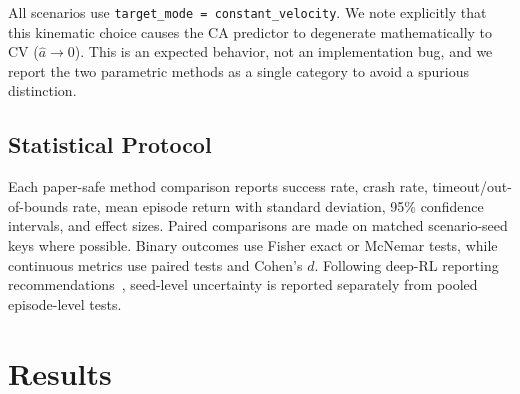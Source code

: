 \documentclass[conference]{IEEEtran}
\begin{document}
All scenarios use \texttt{target\_mode = constant\_velocity}. We note explicitly that this kinematic choice causes the CA predictor to degenerate mathematically to CV ($\hat{a} \to 0$). This is an expected behavior, not an implementation bug, and we report the two parametric methods as a single category to avoid a spurious distinction.

\subsection{Statistical Protocol}

Each paper-safe method comparison reports success rate, crash rate, timeout/out-of-bounds rate, mean episode return with standard deviation, 95\% confidence intervals, and effect sizes. Paired comparisons are made on matched scenario-seed keys where possible. Binary outcomes use Fisher exact or McNemar tests, while continuous metrics use paired tests and Cohen's $d$. Following deep-RL reporting recommendations~\cite{henderson2018deep,patterson2023empirical}, seed-level uncertainty is reported separately from pooled episode-level tests.

\section{Results}\label{sec:results}





\end{document}
